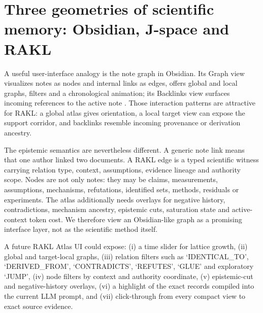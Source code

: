 \section{Three geometries of scientific memory: Obsidian, J-space and RAKL}
A useful user-interface analogy is the note graph in Obsidian. Its Graph view visualizes notes as nodes and internal links as edges, offers global and local graphs, filters and a chronological animation; its Backlinks view surfaces incoming references to the active note \cite{obsidiangraph2026,obsidianbacklinks2026}. Those interaction patterns are attractive for RAKL: a global atlas gives orientation, a local target view can expose the support corridor, and backlinks resemble incoming provenance or derivation ancestry.

The epistemic semantics are nevertheless different. A generic note link means that one author linked two documents. A RAKL edge is a typed scientific witness carrying relation type, context, assumptions, evidence lineage and authority scope. Nodes are not only notes: they may be claims, measurements, assumptions, mechanisms, refutations, identified sets, methods, residuals or experiments. The atlas additionally needs overlays for negative history, contradictions, mechanism ancestry, epistemic cuts, saturation state and active-context token cost. We therefore view an Obsidian-like graph as a promising interface layer, not as the scientific method itself.

A future RAKL Atlas UI could expose: (i) a time slider for lattice growth, (ii) global and target-local graphs, (iii) relation filters such as `IDENTICAL\_TO', `DERIVED\_FROM', `CONTRADICTS', `REFUTES', `GLUE' and exploratory `JUMP', (iv) node filters by context and authority coordinate, (v) epistemic-cut and negative-history overlays, (vi) a highlight of the exact records compiled into the current LLM prompt, and (vii) click-through from every compact view to exact source evidence.

